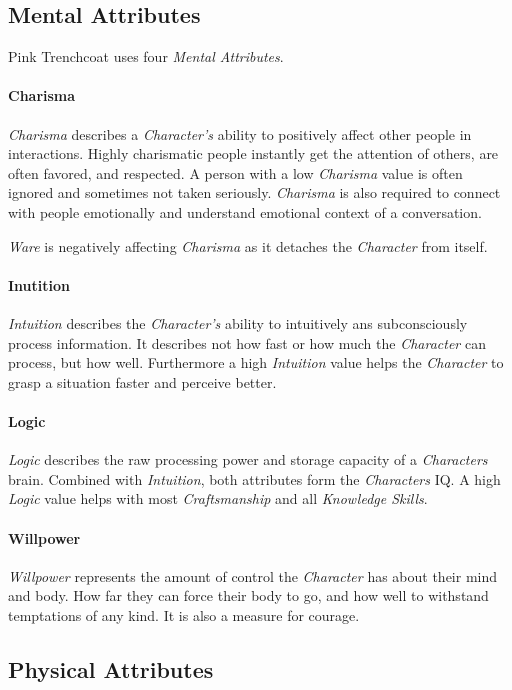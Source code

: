 \subsection{Mental Attributes}
Pink Trenchcoat uses four \emph{Mental Attributes}.
\paragraph{Charisma}
\emph{Charisma} describes a \emph{Character's} ability to positively affect other
people in interactions. Highly charismatic people instantly get the attention of
others, are often favored, and respected. A person with a low \emph{Charisma} value is
often ignored and sometimes not taken seriously.
\emph{Charisma} is also required to connect with people emotionally and understand
emotional context of a conversation.

\emph{Ware} is negatively affecting \emph{Charisma} as it detaches the \emph{Character}
from itself.

\paragraph{Inutition}
\emph{Intuition} describes the \emph{Character's} ability to intuitively ans
subconsciously process information. It describes not how fast or how much
the \emph{Character} can process, but how well. Furthermore a high \emph{Intuition}
value helps the \emph{Character} to grasp a situation faster and perceive better.

\paragraph{Logic}
\emph{Logic} describes the raw processing power and storage capacity of a
\emph{Characters} brain. Combined with \emph{Intuition}, both attributes form the
\emph{Characters} IQ. A high \emph{Logic} value helps with most \emph{Craftsmanship}
and all \emph{Knowledge Skills}.

\paragraph{Willpower}
\emph{Willpower} represents the amount of control the \emph{Character} has about
their mind and body. How far they can force their body to go, and how well to
withstand temptations of any kind. It is also a measure for courage.

\subsection{Physical Attributes}

